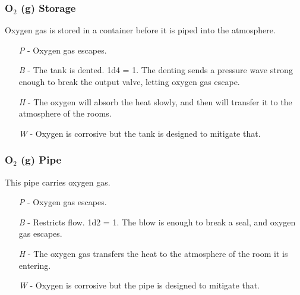 \documentclass[a4paper]{article}
\begin{document}
\vspace{-0.5cm} \hspace{-18pt} \subsubsection{O$_2$ (g) Storage} \label{life_o2_storage} \vspace{-0.2cm}
Oxygen gas is stored in a container before it is piped into the atmosphere.
\begin{enumerate}
\item [\textit{P}] - Oxygen gas escapes.
\item [\textit{B}] - The tank is dented. \newline \hspace*{3pt} 1d4 = 1. The denting sends a pressure wave strong enough to break the output valve, letting oxygen gas escape.
\item [\textit{H}] - The oxygen will absorb the heat slowly, and then will transfer it to the atmosphere of the rooms.
\item [\textit{W}] - Oxygen is corrosive but the tank is designed to mitigate that.
\end{enumerate}

\vspace{-0.5cm} \hspace{-18pt} \subsubsection{O$_2$ (g) Pipe} \label{life_o2_pipe} \vspace{-0.2cm}
This pipe carries oxygen gas.
\begin{enumerate}
\item [\textit{P}] - Oxygen gas escapes.
\item [\textit{B}] - Restricts flow. \newline \hspace*{3pt} 1d2 = 1. The blow is enough to break a seal, and oxygen gas escapes.
\item [\textit{H}] - The oxygen gas transfers the heat to the atmosphere of the room it is entering.
\item [\textit{W}] - Oxygen is corrosive but the pipe is designed to mitigate that.
\end{enumerate}
\end{document}
